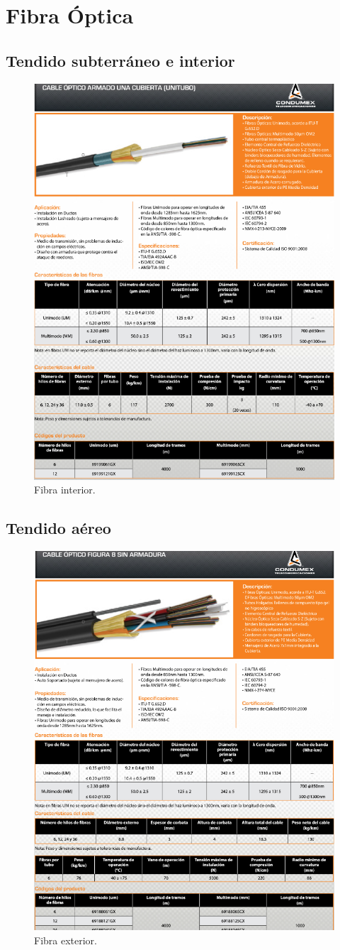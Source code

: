 \documentclass[12pt,letterpaper]{article}
\begin{document}
\newpage
\section{Fibra Óptica}
\subsection{Tendido subterráneo e interior}
\begin{figure}[ht]
    \centering
    \includegraphics[width=.68\textwidth]{f33.png}
    \caption{Fibra interior.}
\end{figure}

\newpage
\subsection{Tendido aéreo}
\begin{figure}[ht]
    \centering
    \includegraphics[width=.68\textwidth]{f34.png}
    \caption{Fibra exterior.}
\end{figure}
\end{document}
